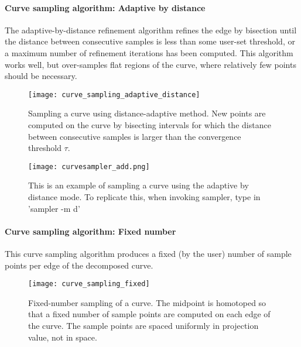 \paragraph{Curve sampling algorithm: Adaptive by distance}

The adaptive-by-distance refinement algorithm refines the edge by bisection until the distance between consecutive samples is less than some user-set threshold, or a maximum number of refinement iterations has been computed.  This algorithm works well, but over-samples flat regions of the curve, where relatively few points should be necessary.  


\begin{figure}[H]
\begin{center}
\texttt{[image: curve\_sampling\_adaptive\_distance]}
\caption[Adaptive-distance curve sampling]{Sampling a curve using distance-adaptive method.  New points are computed on the curve by bisecting intervals for which the distance between consecutive samples is larger than the convergence threshold $\tau$.}
\end{center}
\end{figure}

\begin{figure}[H]
\centering
\texttt{[image: curvesampler\_add.png]}
\caption{This is an example of sampling a curve using the adaptive by distance mode. To replicate this, when invoking sampler, type in 'sampler -m d'}
\end{figure}



\paragraph{Curve sampling algorithm: Fixed number}

This curve sampling algorithm produces a fixed (by the user) number of sample points per edge of the decomposed curve.  


\begin{figure}[H]
\begin{center}
\texttt{[image: curve\_sampling\_fixed]}
\caption[Fixed-number sampling of a curve -- how it works]{Fixed-number sampling of a curve.  The midpoint is homotoped so that a fixed number of sample points are computed on each edge of the curve.  The sample points are spaced uniformly in projection value, not in space.}
\end{center}
\end{figure}

